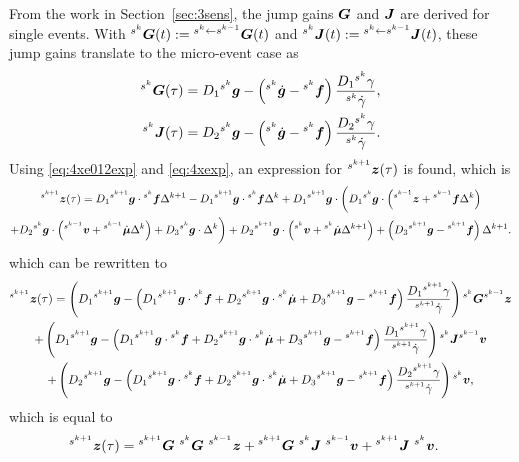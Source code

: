 \documentclass[../DC2019003Bouma.tex]{subfiles}
\begin{document}
From the work in Section~\ref{sec:3sens}, the jump gains $\Gb$ and $\Jb$ are derived for single events. With $\ls^{s^k}\Gb(t) := \ls^{s^{k}\leftarrow s^{k-1}}\Gb(t)$ and $\ls^{s^k}\Jb(t) := \ls^{s^{k}\leftarrow s^{k-1}}\Jb(t)$, these jump gains translate to the micro-event case as
\begin{align}
\ls^{s^k}\Gb(\tau) &= D_1\ls^{s^k}\gb - \left(\ls^{s^k}\dot{\gb} - \ls^{s^{k}}\fb\right)\frac{D_1\ls^{s^k}\gamma}{\ls^{s^k}\dot{\gamma}},\\
\ls^{s^k}\Jb(\tau) &= D_2\ls^{s^k}\gb - \left(\ls^{s^k}\dot{\gb} - \ls^{s^{k}}\fb\right)\frac{D_2\ls^{s^k}\gamma}{\ls^{s^k}\dot{\gamma}}.
\end{align}
Using \eqref{eq:4xe012exp} and \eqref{eq:4xexp}, an expression for $\ls^{s^{k+1}}\zb(\tau)$ is found, which is
\begin{multline}
\ls^{s^{k+1}}\zb(\tau) = D_1\ls^{s^{k+1}}\gb\cdot\ls^{s^{k}}\fb\Delta^{k+1} - D_1\ls^{s^{k+1}}\gb\cdot\ls^{s^{k}}\fb\Delta^{k} + D_1\ls^{s^{k+1}}\gb\cdot \bigg( D_1\ls^{s^{k}}\gb\cdot\left(\ls^{s^{k-1}}\zb+\ls^{s^{k-1}}\fb\Delta^{k}\right)\\
+D_2\ls^{s^{k}}\gb\cdot\left(\ls^{s^{k-1}}\vb+\ls^{s^{k-1}}\dot{\mub}\Delta^{k}\right)+D_3\ls^{s^{k}}\gb\cdot\Delta^{k}\bigg) + D_2 \ls^{s^{k+1}}\gb\cdot\left(\ls^{s^{k}}\vb+\ls^{s^{k}}\dot{\mub}\Delta^{k+1} \right) + \left(D_3\ls^{s^{k+1}}\gb - \ls^{s^{k+1}}\fb\right)\Delta^{k+1}.\label{eq:4ztau}
\end{multline}
which can be rewritten to 
\begin{multline}
\ls^{s^{k+1}}\zb(\tau) = \left(D_1\ls^{s^{k+1}}\gb - \left(D_1\ls^{s^{k+1}}\gb\cdot\ls^{s^{k}}\fb  + D_2\ls^{s^{k+1}}\gb\cdot\ls^{s^{k}}\dot{\mub} + D_3\ls^{s^{k+1}}\gb - \ls^{s^{k+1}}\fb\right)\frac{D_1\ls^{s^{k+1}}\gamma}{\ls^{s^{k+1}}\dot{\gamma}} \right)\ls^{s^k}\Gb\ls^{s^{k-1}}\zb\\
+ \left(D_1\ls^{s^{k+1}}\gb - \left(D_1\ls^{s^{k+1}}\gb\cdot\ls^{s^{k}}\fb  + D_2\ls^{s^{k+1}}\gb\cdot\ls^{s^{k}}\dot{\mub} + D_3\ls^{s^{k+1}}\gb - \ls^{s^{k+1}}\fb\right)\frac{D_1\ls^{s^{k+1}}\gamma}{\ls^{s^{k+1}}\dot{\gamma}} \right)\ls^{s^k}\Jb\ls^{s^{k-1}}\vb\\
+ \left(D_2\ls^{s^{k+1}}\gb - \left(D_1\ls^{s^{k+1}}\gb\cdot\ls^{s^{k}}\fb  + D_2\ls^{s^{k+1}}\gb\cdot\ls^{s^{k}}\dot{\mub} + D_3\ls^{s^{k+1}}\gb - \ls^{s^{k+1}}\fb\right)\frac{D_2\ls^{s^{k+1}}\gamma}{\ls^{s^{k+1}}\dot{\gamma}} \right)\ls^{s^{k}}\vb,
\end{multline}
which is equal to
\begin{align}
&\ls^{s^{k+1}}\zb(\tau) = \ls^{s^{k+1}}\Gb\ \ls^{s^{k}}\Gb\ \ls^{s^{k-1}}\zb + \ls^{s^{k+1}}\Gb\ \ls^{s^{k}}\Jb\ \ls^{s^{k-1}}\vb + \ls^{s^{k+1}}\Jb\ \ls^{s^{k}}\vb.\label{eq:4zkplusfinal}
\end{align}
\end{document}
